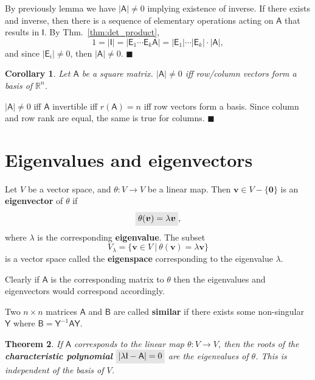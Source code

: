 \documentclass[letter-paper]{tufte-book}
\newtheorem{theorem}{\color{pastel-blue}Theorem}[section]
\newtheorem{corollary}[theorem]{\color{pastel-blue}Corollary}
\newenvironment{proof}[1][Proof]{\begin{trivlist}
\item[\hskip \labelsep {\bfseries #1}]}{\end{trivlist}}
\newcommand{\As}{{\mathsf{A}}}
\newcommand{\Bs}{{\mathsf{B}}}
\newcommand{\Is}{{\mathsf{I}}}
\newcommand{\Ys}{{\mathsf{Y}}}
\newcommand{\Ob}{{\boldsymbol{0}}}
\newcommand{\vb}{{\boldsymbol{v}}}
\newcommand{\qed}{\hfill$\blacksquare$}
\newcommand{\highlight}[1]{\mathchoice%
  {\colorbox{black!10}{$\displaystyle#1$}}%
  {\colorbox{black!10}{$\textstyle#1$}}%
  {\colorbox{black!10}{$\scriptstyle#1$}}%
  {\colorbox{black!10}{$\scriptscriptstyle#1$}}}%
\begin{document}
\begin{proof}
  By previously lemma we have $|\As| \neq 0$ implying existence of inverse. If there exists and inverse, then there is a sequence of elementary operations acting on $\As$ that results in $\Is$. By Thm.~\ref{thm:det_product},
  \begin{equation*}
    1 = |\Is| = |\mathsf{E}_1\cdots\mathsf{E}_k \As| = |\mathsf{E}_1|\cdots|\mathsf{E}_k|\cdot|\As|,
  \end{equation*}
  and since $|\mathsf{E}_i|\neq 0$, then $|\As|\neq 0$. \qed
\end{proof}

\begin{corollary}
  Let $\As$ be a square matrix. $|\As| \neq 0$ iff row/column vectors form a basis of $\mathbb{R}^n$.  
\end{corollary}

\begin{proof}
  $|\As| \neq 0$ iff $\As$ invertible iff $r(\As) = n$ iff row vectors form a basis. Since column and row rank are equal, the same is true for columns. \qed
\end{proof}



\section{Eigenvalues and eigenvectors}

Let $V$ be a vector space, and $\theta:V \to V$ be a linear map. Then $\vb\in V-\{\Ob\}$ is an \textbf{eigenvector} of $\theta$ if
\begin{equation}
  \highlight{\theta(\vb) = \lambda \vb},
\end{equation}
where $\lambda$ is the corresponding \textbf{eigenvalue}. The subset
\begin{equation}
  V_{\lambda} = \{\vb\in V \ |\ \theta(\vb) = \lambda \vb\}
\end{equation}
is a vector space called the \textbf{eigenspace} corresponding to the eigenvalue $\lambda$.

Clearly if $\As$ is the corresponding matrix to $\theta$ then the eigenvalues and eigenvectors would correspond accordingly.

Two $n\times n$ matrices $\As$ and $\Bs$ are called \textbf{similar} if there exists some non-singular $\Ys$ where $\Bs = \Ys^{-1} \As \Ys$.

\begin{theorem}
  If $\As$ corresponds to the linear map $\theta:V\to V$, then the roots of the \textbf{characteristic polynomial} $\highlight{|\lambda\Is - \As| = 0}$ are the eigenvalues of $\theta$. This is independent of the basis of $V$.
\end{theorem}
\end{document}
